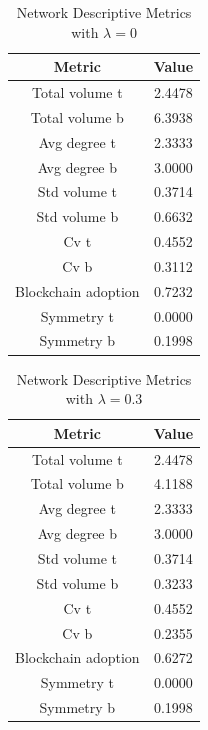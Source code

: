 \begin{table}[H]
\centering
\caption{Network Descriptive Metrics with $\lambda = 0$}
\label{tab:network_metrics}
\begin{tabular}{|c|c|}
\toprule
Metric & Value \\
\midrule
Total volume t & 2.4478 \\  
Total volume b & 6.3938 \\
Avg degree t & 2.3333 \\
Avg degree b & 3.0000 \\
Std volume t & 0.3714 \\
Std volume b & 0.6632 \\
Cv t & 0.4552 \\
Cv b & 0.3112 \\
Blockchain adoption & 0.7232 \\
Symmetry t & 0.0000 \\
Symmetry b & 0.1998 \\
\bottomrule
\end{tabular}
\end{table}


\begin{table}[H]
\centering
\caption{Network Descriptive Metrics with $\lambda = 0.3$}
\label{tab:network_metrics}
\begin{tabular}{|c|c|}
\toprule
Metric & Value \\
\midrule
Total volume t & 2.4478 \\
Total volume b & 4.1188 \\
Avg degree t & 2.3333 \\
Avg degree b & 3.0000 \\
Std volume t & 0.3714 \\
Std volume b & 0.3233 \\
Cv t & 0.4552 \\
Cv b & 0.2355 \\
Blockchain adoption & 0.6272 \\
Symmetry t & 0.0000 \\
Symmetry b & 0.1998 \\
\bottomrule
\end{tabular}
\end{table}

